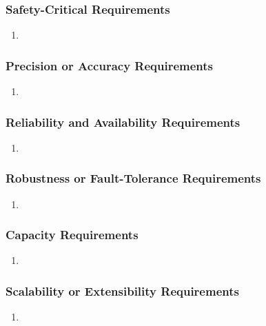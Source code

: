 \documentclass[]{article}
\begin{document}
\subsubsection{Safety-Critical Requirements}
\label{ssub:safety_critical_requirements}
\begin{enumerate}[{PR}1. ]
	\item 
\end{enumerate}

\subsubsection{Precision or Accuracy Requirements}
\label{ssub:precision_or_accuracy_requirements}
\begin{enumerate}[{PR}1. ]
	\item 
\end{enumerate}

\subsubsection{Reliability and Availability Requirements}
\label{ssub:reliability_and_availability_requirements}
\begin{enumerate}[{PR}1. ]
	\item 
\end{enumerate}

\subsubsection{Robustness or Fault-Tolerance Requirements}
\label{ssub:robustness_or_fault_tolerance_requirements}
\begin{enumerate}[{PR}1. ]
	\item 
\end{enumerate}

\subsubsection{Capacity Requirements}
\label{ssub:capacity_requirements}
\begin{enumerate}[{PR}1. ]
	\item 
\end{enumerate}

\subsubsection{Scalability or Extensibility Requirements}
\label{ssub:scalability_or_extensibility_requirements}
\begin{enumerate}[{PR}1. ]
	\item 
\end{enumerate}
\end{document}
